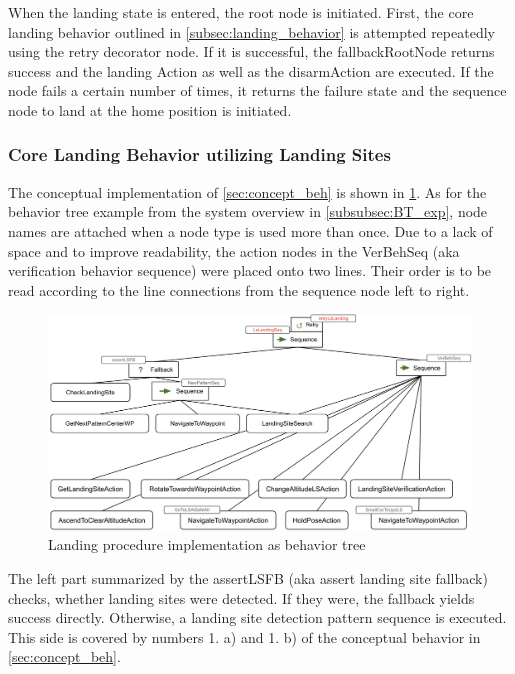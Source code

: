 When the landing state is entered, the root node is initiated. First, the core landing behavior outlined in \cref{subsec:landing_behavior} is attempted repeatedly using the retry decorator node. If it is successful, the fallbackRootNode returns success and the landing Action as well as the disarmAction are executed. If the node fails a certain number of times, it returns the failure state and the sequence node to land at the home position is initiated.

\subsubsection{Core Landing Behavior utilizing Landing Sites}

The conceptual implementation of \cref{sec:concept_beh} is shown in \cref{fig:landing_BT}. As for the behavior tree example from the system overview in \cref{subsubsec:BT_exp}, node names are attached when a node type is used more than once. Due to a lack of space and to improve readability, the action nodes in the VerBehSeq (aka verification behavior sequence) were placed onto two lines. Their order is to be read according to the line connections from the sequence node left to right.

\begin{figure}[h]
\centering
\includegraphics[scale=0.18]{images/autonomous_landing/landing_behavior_BT.png}
\caption{Landing procedure implementation as behavior tree}
\label{fig:landing_BT}
\end{figure}

The left part summarized by the assertLSFB (aka assert landing site fallback) checks, whether landing sites were detected. If they were, the fallback yields success directly. Otherwise, a landing site detection pattern sequence is executed. This side is covered by numbers 1. a) and 1. b) of the conceptual behavior in \cref{sec:concept_beh}.


